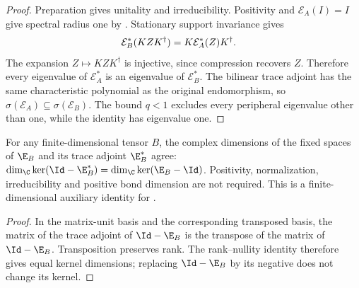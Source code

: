 \begin{proof}\leanok
    Preparation gives unitality and irreducibility. Positivity and
    $\mathcal E_A(I)=I$ give spectral radius one by
    \cite[Proposition~6.1]{Wolf2012Quantum}.
    Stationary support invariance gives
    \begin{align}
        \mathcal E_B^*(KZK^\dagger)
         & =K\mathcal E_A^*(Z)K^\dagger.\notag
    \end{align}
    The expansion $Z\mapsto KZK^\dagger$ is injective, since compression
    recovers $Z$. Therefore every eigenvalue of $\mathcal E_A^*$ is an
    eigenvalue of $\mathcal E_B^*$. The bilinear trace adjoint has the
    same characteristic polynomial as the original endomorphism, so
    $\sigma(\mathcal E_A)\subseteq\sigma(\mathcal E_B)$.
    The bound $q<1$ excludes every peripheral eigenvalue other than one,
    while the identity has eigenvalue one.
\end{proof}


\begin{lemma}
    \label{thm:spc_aux_adjoint_fixed_dimension}
    \leanok
    For any finite-dimensional tensor $B$, the complex dimensions of the
    fixed spaces of $\E_B$ and its trace adjoint $\E_B^*$ agree:
    $\dim_{\C}\ker(\Id-\E_B^*)=\dim_{\C}\ker(\E_B-\Id)$.
    Positivity, normalization, irreducibility and positive bond dimension
    are not required. This is a finite-dimensional auxiliary identity for
    \cite[Appendix~C, lines~2653--2717]{Schuch2011Phases}.
\end{lemma}

\begin{proof}\leanok
    In the matrix-unit basis and the corresponding transposed basis,
    the matrix of the trace adjoint of $\Id-\E_B$ is the transpose of
    the matrix of $\Id-\E_B$. Transposition preserves rank.
    The rank--nullity identity therefore gives equal kernel dimensions;
    replacing $\Id-\E_B$ by its negative does not change its kernel.
\end{proof}


